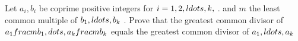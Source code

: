 \documentclass[a4paper]{article}
\begin{document}
Let $a_{i}, b_{i}$ be coprime positive integers for $i=1, 2, \\ldots, k,$ .
and $m$ the least common multiple of $b_{1}, \\ldots, b_{k}$ . 
Prove that the greatest common divisor of $a_{1} \\frac{m} {b_{1}}, \\dots, a_{k} \\frac{m} {b_{k}}$ 
equals the greatest common divisor of $a_{1}, \\ldots, a_{k}$
\end{document}
